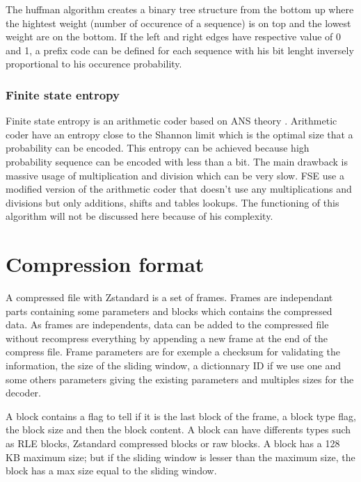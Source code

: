 \documentclass{sig-alternate-05-2015}
\begin{document}
        The huffman algorithm creates a binary tree structure from the bottom up where the hightest
        weight (number of occurence of a sequence) is on top and the lowest weight are on the
        bottom. If the left and right edges have respective value of 0 and 1, a prefix code can be
        defined for each sequence with his bit lenght inversely proportional to his occurence
        probability.

    \subsubsection{Finite state entropy}
        Finite state entropy \cite{fse} is an arithmetic coder based on ANS theory \cite{ANS2013}.
        Arithmetic coder have an entropy close to the Shannon limit which is the optimal size that a
        probability can be encoded. This entropy can be achieved because high probability sequence
        can be encoded with less than a bit. The main drawback is massive usage of multiplication
        and division which can be very slow. FSE use a modified version of the arithmetic coder that
        doesn't use any multiplications and divisions but only additions, shifts and tables lookups. The
        functioning of this algorithm will not be discussed here because of his complexity.

\section{Compression format}
    A compressed file with Zstandard \cite{compress_format} is a set of frames. Frames are
    independant parts containing some parameters and blocks which contains the compressed data. As
    frames are independents, data can be added to the compressed file without recompress everything by
    appending a new frame at the end of the compress file. Frame parameters are for exemple a
    checksum for validating the information, the size of the sliding window, a dictionnary ID if we
    use one and some others parameters giving the existing parameters and multiples sizes for the
    decoder.

    A block contains a flag to tell if it is the last block of the frame, a block type flag, the
    block size and then the block content. A block can have differents types such as RLE blocks,
    Zstandard compressed blocks or raw blocks. A block has a 128 KB maximum size; but if the sliding
    window is lesser than the maximum size, the block has a max size equal to the sliding window.
\end{document}
